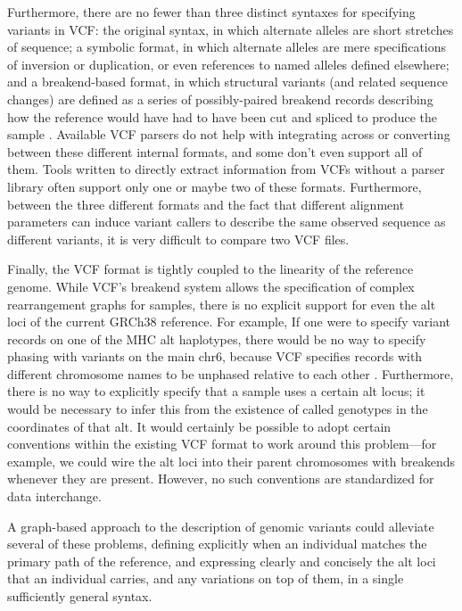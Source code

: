 \documentclass[11pt,proposal]{ucthesis}
\begin{document}
Furthermore, there are no fewer than three distinct syntaxes for specifying variants in VCF: the original syntax, in which alternate alleles are short stretches of sequence; a symbolic format, in which alternate alleles are mere specifications of inversion or duplication, or even references to named alleles defined elsewhere; and a breakend-based format, in which structural variants (and related sequence changes) are defined as a series of possibly-paired breakend records describing how the reference would have had to have been cut and spliced to produce the sample \cite{marshall2013variant}. Available VCF parsers do not help with integrating across or converting between these different internal formats, and some don't even support all of them. Tools written to directly extract information from VCFs without a parser library often support only one or maybe two of these formats. Furthermore, between the three different formats and the fact that different alignment parameters can induce variant callers to describe the same observed sequence as different variants, it is very difficult to compare two VCF files.

Finally, the VCF format is tightly coupled to the linearity of the reference genome. While VCF's breakend system allows the specification of complex rearrangement graphs for samples, there is no explicit support for even the alt loci of the current GRCh38 reference. For example, If one were to specify variant records on one of the MHC alt haplotypes, there would be no way to specify phasing with variants on the main chr6, because VCF specifies records with different chromosome names to be unphased relative to each other \cite{marshall2013variant}. Furthermore, there is no way to explicitly specify that a sample uses a certain alt locus; it would be necessary to infer this from the existence of called genotypes in the coordinates of that alt. It would certainly be possible to adopt certain conventions within the existing VCF format to work around this problem---for example, we could wire the alt loci into their parent chromosomes with breakends whenever they are present. However, no such conventions are standardized for data interchange.

A graph-based approach to the description of genomic variants could alleviate several of these problems, defining explicitly when an individual matches the primary path of the reference, and expressing clearly and concisely the alt loci that an individual carries, and any variations on top of them, in a single sufficiently general syntax.
\end{document}
